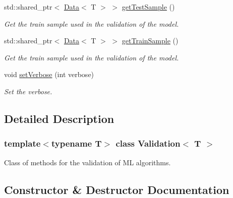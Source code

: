 \begin{DoxyCompactItemize}
std\+::shared\+\_\+ptr$<$ \hyperlink{class_data}{Data}$<$ T $>$ $>$ \hyperlink{class_validation_a2370445658f5e86e39e8c18fc8b971d0}{get\+Test\+Sample} ()
\begin{DoxyCompactList}\small\item\em Get the train sample used in the validation of the model. \end{DoxyCompactList}\item 
std\+::shared\+\_\+ptr$<$ \hyperlink{class_data}{Data}$<$ T $>$ $>$ \hyperlink{class_validation_a11cf518681b25799f231ce973ad45095}{get\+Train\+Sample} ()
\begin{DoxyCompactList}\small\item\em Get the train sample used in the validation of the model. \end{DoxyCompactList}\item 
void \hyperlink{class_validation_adddf2e9eb960b7636e6615ecbd9783bb}{set\+Verbose} (int verbose)
\begin{DoxyCompactList}\small\item\em Set the verbose. \end{DoxyCompactList}\end{DoxyCompactItemize}


\subsection{Detailed Description}
\subsubsection*{template$<$typename T$>$\newline
class Validation$<$ T $>$}

Class of methods for the validation of ML algorithms. 

\subsection{Constructor \& Destructor Documentation}
\mbox{\label{class_validation_a91399f8b544cb22de02b85618ef5b0cc}} 
